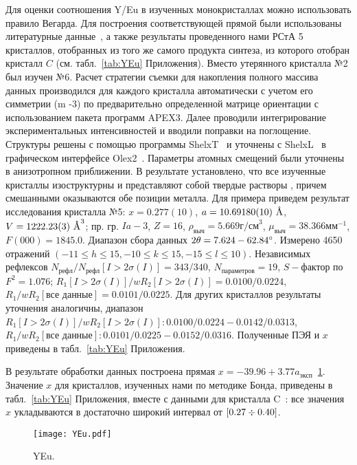 Для оценки соотношения Y/Eu в изученных монокристаллах можно использовать правило Вегарда.
Для построения соответствующей прямой были использованы литературные данные~\cite{Swanson:1954,Morris:1984,Nikolaev:2023}, а также результаты проведенного нами РСтА 5 кристаллов, отобранных из того же самого продукта синтеза, из которого отобран кристалл $C$ (см. табл.~\ref{tab:YEu} Приложения).
Вместо утерянного кристалла №2 был изучен №6.
Расчет стратегии съемки для накопления полного массива данных производился для каждого кристалла автоматически с учетом его симметрии \hkl(m -3) по предварительно определенной матрице ориентации с использованием пакета программ APEX3.
Далее проводили интегрирование экспериментальных интенсивностей и вводили поправки на поглощение.
Структуры решены с помощью программы ShelxT~\cite{Sheldrick:2015:shelxt} и уточнены с ShelxL~\cite{Sheldrick:2015:shelxl} в графическом интерфейсе Olex2~\cite{Dolomanov:2009}.
Параметры атомных смещений были уточнены в анизотропном приближении.
В результате установлено, что все изученные кристаллы изоструктурны и представляют собой твердые растворы \YEu{}, причем смешанными оказываются обе позиции металла.
Для примера приведем результат исследования кристалла №5: $x = 0.277(10)$, $a = 10.69180(10)\ \text{\AA}$, $V = 1222.23(3)\ \text{\AA}^3$; пр. гр. $Ia-3$, $Z = 16$, $\rho_\text{выч} = 5.669\unit{г/см}^3$, $\mu_\text{выч} = 38.366\unit{мм}^{-1}$, $F(000) = 1845.0$.
Диапазон сбора данных $2\theta = 7.624-62.84^\circ$.
Измерено 4650 отражений $(-11 \leq h \leq 15, -10 \leq k \leq 15, -15 \leq l \leq 10)$.
Независимых рефлексов $N_\text{рефл}/N_\text{рефл} [I > 2\sigma (I)] = 343/340$, $N_\text{параметров} = 19$, $S-\text{фактор}$ по $F^2 = 1.076$; $R_1 [I > 2\sigma (I)]/wR_2 [I > 2\sigma (I)] = 0.0100/0.0224$, $R_1/wR_2 [\text{все данные}] = 0.0101/0.0225$.
Для других кристаллов результаты уточнения аналогичны, диапазон $R_1 [I > 2\sigma (I)]/wR_2 [I > 2\sigma (I)]: 0.0100/0.0224 - 0.0142/0.0313$, $R_1/wR_2 [\text{все данные}]: 0.0101/0.0225 - 0.0152/0.0316$.
Полученные ПЭЯ и $x$ приведены в табл.~\ref{tab:YEu} Приложения.

В результате обработки данных построена прямая $x = -39.96 + 3.77 a_\text{эксп}$~\ref{fig:YEu}.
Значение $x$ для кристаллов, изученных нами по методике Бонда, приведены в табл.~\ref{tab:YEu} Приложения, вместе с данными для кристалла C~\cite{Nikolaev:2023}: все значения $x$ укладываются в достаточно широкий интервал от $[0.27\div0.40]$.

\begin{figure}[ht!]
    \centering
    \texttt{[image: YEu.pdf]}
    \caption{YEu.}%
    \label{fig:YEu}
\end{figure}
